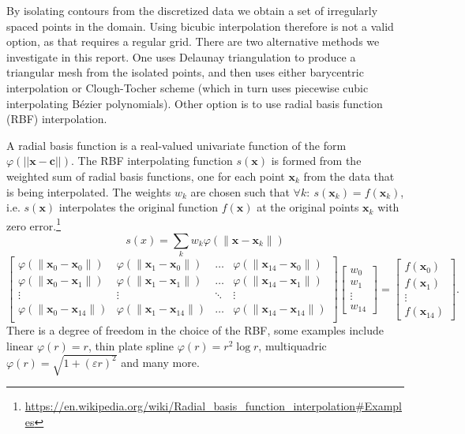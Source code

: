 \documentclass[a4paper,10pt]{report}
\begin{document}
By isolating contours from the discretized data we obtain a set of irregularly spaced points in the domain. Using bicubic interpolation therefore is not a valid option, as that requires a regular grid. There are two alternative methods we investigate in this report. One uses Delaunay triangulation to produce a triangular mesh from the isolated points, and then uses either barycentric interpolation or Clough-Tocher scheme (which in turn uses piecewise cubic interpolating Bézier polynomials). Other option is to use radial basis function (RBF) interpolation.

A radial basis function is a real-valued univariate function of the form $\varphi(||\mathbf{x}-\mathbf{c}||)$. The RBF interpolating function $s(\mathbf{x})$ is formed from the weighted sum of radial basis functions, one for each point $\mathbf{x}_k$ from the data that is being interpolated. The weights $w_k$ are chosen such that $\forall k:\ s(\mathbf{x}_k)=f(\mathbf{x}_k)$, i.e. $s(\mathbf{x})$ interpolates the original function $f(\mathbf{x})$ at the original points $\mathbf{x}_k$ with zero error.\footnote{\url{https://en.wikipedia.org/wiki/Radial\_basis\_function\_interpolation\#Examples}}
$$
s(x) = \sum\limits_{k} w_k \varphi(\|\mathbf{x}-\mathbf{x}_k\|)
$$
\begin{equation*}
 \begin{bmatrix}
\varphi(\|\mathbf{x}_0 - \mathbf{x}_0\|) & \varphi(\|\mathbf{x}_1 - \mathbf{x}_0\|) & \dots & \varphi(\|\mathbf{x}_{14} - \mathbf{x}_0\|) \\
\varphi(\|\mathbf{x}_0 - \mathbf{x}_1\|) & \varphi(\|\mathbf{x}_1 - \mathbf{x}_1\|) & \dots & \varphi(\|\mathbf{x}_{14} - \mathbf{x}_{1}\|) \\
\vdots & \vdots & \ddots & \vdots \\
\varphi(\|\mathbf{x}_0 - \mathbf{x}_{14}\|) & \varphi(\|\mathbf{x}_1 - \mathbf{x}_{14}\|) & \dots & \varphi(\|\mathbf{x}_{14} - \mathbf{x}_{14}\|) \\
\end{bmatrix}
\begin{bmatrix}w_0 \\ w_1 \\ \vdots \\ w_{14}\end{bmatrix}
= \begin{bmatrix}f(\mathbf{x}_0) \\ f(\mathbf{x}_1) \\ \vdots \\ f(\mathbf{x}_{14})\end{bmatrix}.
\end{equation*}
There is a degree of freedom in the choice of the RBF, some examples include linear $\varphi(r) = r$, thin plate spline $\varphi(r) = r^2\log{r}$, multiquadric $\varphi(r) = \sqrt{1+(\varepsilon r)^2}$ and many more.
\end{document}
